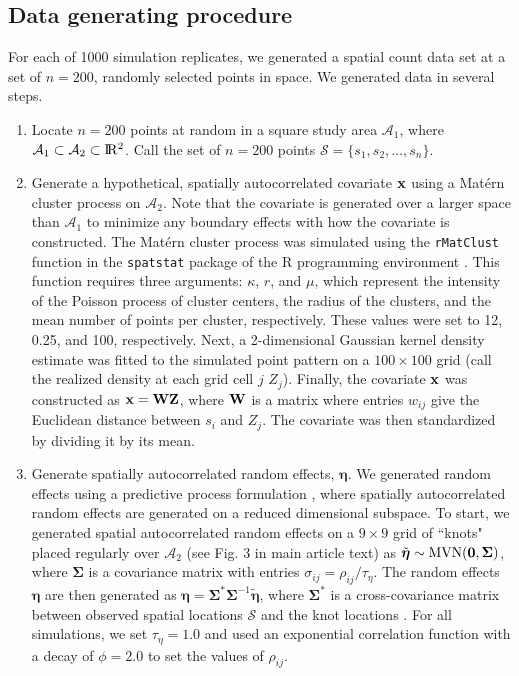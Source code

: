 \documentclass[12pt,fleqn]{article}
\def\bfx{{\bf x}}
\def\bfeta{\boldsymbol{\eta}}
\def\bfSigma{\boldsymbol{\Sigma}}
\def\R2{\rm I\!R^2}
\begin{document}
\rm \begin{flushleft}

\section{Data generating procedure}

For each of 1000 simulation replicates, we generated a spatial count data set at a set of $n=200$, randomly selected points in space.  We generated data in several steps.

\begin{enumerate}
  \item Locate $n=200$ points at random in a square study area $\mathcal{A}_1$, where $\mathcal{A}_1 \subset \mathcal{A}_2 \subset \R2$.  Call the set of $n=200$ points $\mathcal{S} = \{ s_1, s_2, \hdots, s_n \}$.
  \item Generate a hypothetical, spatially autocorrelated covariate $\bfx$ using a Mat\'{e}rn cluster process on $\mathcal{A}_2$.  Note that the covariate is generated over a larger space than $\mathcal{A}_1$ to minimize any boundary effects with how the covariate is constructed.  The Mat\'{e}rn cluster process was simulated using the \texttt{rMatClust} function in the \texttt{spatstat} package \citep{BaddeleyEtAl2015} of the R programming environment \citep{RTeam2017}.  This function requires three arguments: $\kappa$, $r$, and $\mu$, which represent the intensity of the Poisson process of cluster centers, the radius of the clusters, and the mean number of points per cluster, respectively.  These values were set to 12, 0.25, and 100, respectively.  Next, a 2-dimensional Gaussian kernel density estimate was fitted to the simulated point pattern on a $100 \times 100$ grid (call the realized density at each grid cell $j$ $Z_j$).  Finally, the covariate $\bfx$ was constructed as $\bfx = {\bf W} {\bf Z}$, where ${\bf W}$ is a matrix where entries $w_{ij}$ give the Euclidean distance between $s_i$ and $Z_j$.  The covariate was then standardized by dividing it by its mean.
  \item Generate spatially autocorrelated random effects, $\bfeta$.  We generated random effects using a predictive process formulation \citep{BanerjeeEtAl2008}, where spatially autocorrelated random effects are generated on a reduced dimensional subspace.  To start, we generated spatial autocorrelated random effects on a $9 \times 9$ grid of ``knots" placed regularly over $\mathcal{A}_2$ (see Fig. 3 in main article text) as $\tilde{\bfeta} \sim \textrm{MVN}({\bf 0},\bfSigma)$, where $\bfSigma$ is a covariance matrix with entries $\sigma_{ij} = \rho_{ij}/\tau_\eta$.  The random effects $\bfeta$ are then generated as $\bfeta = \bfSigma^* \bfSigma^{-1} \tilde{\bfeta}$, where $\bfSigma^*$ is a cross-covariance matrix between observed spatial locations $\mathcal{S}$ and the knot locations \citep{BanerjeeEtAl2008}.  For all simulations, we set $\tau_\eta = 1.0$ and used an exponential correlation function with a decay of $\phi=2.0$ to set the values of $\rho_{ij}$.

\end{enumerate}
\end{flushleft}
\end{document}
